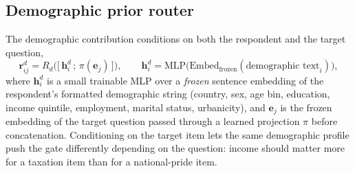 \documentclass[letterpaper]{article} %
\begin{document}
\subsection{Demographic prior router}
\label{sec:demoprior}
The demographic contribution conditions on both the respondent and the target
question,
\begin{equation}
\bm{r}_{ij}^{d} = R_d\big(\big[\,\bm{h}_i^d \,;\, \pi(\bm{e}_j)\,\big]\big),
\qquad
\bm{h}_i^d = \mathrm{MLP}\big(\mathrm{Embed}_{\mathrm{frozen}}(\text{demographic text}_i)\big),
\label{eq:demo}
\end{equation}
where $\bm{h}_i^d$ is a small trainable MLP over a \emph{frozen} sentence
embedding of the respondent's formatted demographic string (country, sex, age
bin, education, income quintile, employment, marital status, urbanicity), and
$\bm{e}_j$ is the frozen embedding of the target question passed through a
learned projection $\pi$ before concatenation. Conditioning on the target item
lets the same demographic profile push the gate differently depending on the
question: income should matter more for a taxation item than for a
national-pride item.
\end{document}
